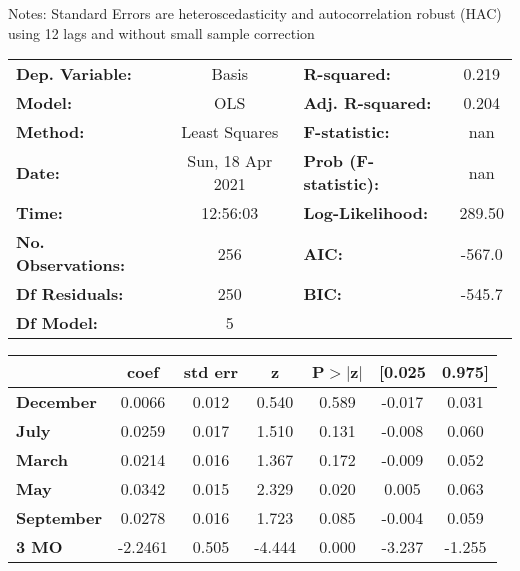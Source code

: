 Notes: \newline
 [1] Standard Errors are heteroscedasticity and autocorrelation robust (HAC) using 12 lags and without small sample correction
\begin{center}
\begin{tabular}{lclc}
\toprule
\textbf{Dep. Variable:}    &      Basis       & \textbf{  R-squared:         } &     0.219   \\
\textbf{Model:}            &       OLS        & \textbf{  Adj. R-squared:    } &     0.204   \\
\textbf{Method:}           &  Least Squares   & \textbf{  F-statistic:       } &       nan   \\
\textbf{Date:}             & Sun, 18 Apr 2021 & \textbf{  Prob (F-statistic):} &      nan    \\
\textbf{Time:}             &     12:56:03     & \textbf{  Log-Likelihood:    } &    289.50   \\
\textbf{No. Observations:} &         256      & \textbf{  AIC:               } &    -567.0   \\
\textbf{Df Residuals:}     &         250      & \textbf{  BIC:               } &    -545.7   \\
\textbf{Df Model:}         &           5      & \textbf{                     } &             \\
\bottomrule
\end{tabular}
\begin{tabular}{lcccccc}
                   & \textbf{coef} & \textbf{std err} & \textbf{z} & \textbf{P$> |$z$|$} & \textbf{[0.025} & \textbf{0.975]}  \\
\midrule
\textbf{December}  &       0.0066  &        0.012     &     0.540  &         0.589        &       -0.017    &        0.031     \\
\textbf{July}      &       0.0259  &        0.017     &     1.510  &         0.131        &       -0.008    &        0.060     \\
\textbf{March}     &       0.0214  &        0.016     &     1.367  &         0.172        &       -0.009    &        0.052     \\
\textbf{May}       &       0.0342  &        0.015     &     2.329  &         0.020        &        0.005    &        0.063     \\
\textbf{September} &       0.0278  &        0.016     &     1.723  &         0.085        &       -0.004    &        0.059     \\
\textbf{3 MO}      &      -2.2461  &        0.505     &    -4.444  &         0.000        &       -3.237    &       -1.255     \\

\end{tabular}
\end{center}

